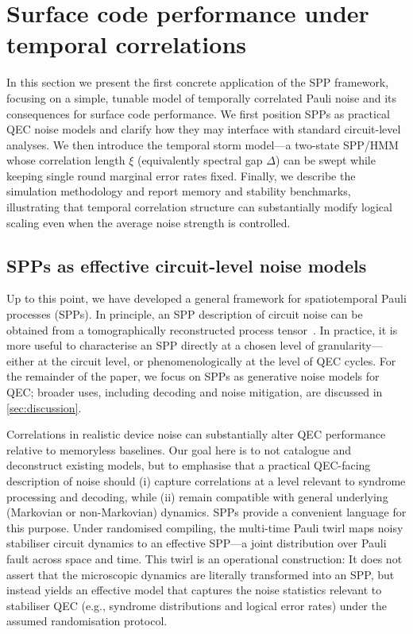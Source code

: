 \section{Surface code performance under temporal correlations}\label{sec:temporalstormmodel}
In this section we present the first concrete application of the SPP framework, focusing on a simple, tunable model of temporally correlated Pauli noise and its consequences for surface code performance. We first position SPPs as practical QEC noise models and clarify how they may interface with standard circuit-level analyses. We then introduce the temporal storm model---a two-state SPP/HMM whose correlation length \(\xi\) (equivalently spectral gap \(\Delta\)) can be swept while keeping single round marginal error rates fixed. Finally, we describe the simulation methodology and report memory and stability benchmarks, illustrating that temporal correlation structure can substantially modify logical scaling even when the average noise strength is controlled.

\subsection{SPPs as effective circuit-level noise models}
Up to this point, we have developed a general framework for spatiotemporal Pauli processes (SPPs). In principle, an SPP description of circuit noise can be obtained from a tomographically reconstructed process tensor~\cite{whiteDemonstrationNonMarkovianProcess2020,whiteUnifyingNonMarkovianCharacterization2025}. In practice, it is more useful to characterise an SPP directly at a chosen level of granularity---either at the circuit level, or phenomenologically at the level of QEC cycles. For the remainder of the paper, we focus on SPPs as generative noise models for QEC; broader uses, including decoding and noise mitigation, are discussed in \cref{sec:discussion}.

Correlations in realistic device noise can substantially alter QEC performance relative to memoryless baselines. 
Our goal here is to not catalogue and deconstruct existing models, but to emphasise that a practical QEC-facing description of noise should (i) capture correlations at a level relevant to syndrome processing and decoding, while (ii) remain compatible with general underlying (Markovian or non-Markovian) dynamics. SPPs provide a convenient language for this purpose. Under randomised compiling, the multi-time Pauli twirl maps noisy stabiliser circuit dynamics to an effective SPP---a joint distribution over Pauli fault across space and time. This twirl is an operational construction: It does not assert that the microscopic dynamics are literally transformed into an SPP, but instead yields an effective model that captures the noise statistics relevant to stabiliser QEC (e.g., syndrome distributions and logical error rates) under the assumed randomisation protocol.

